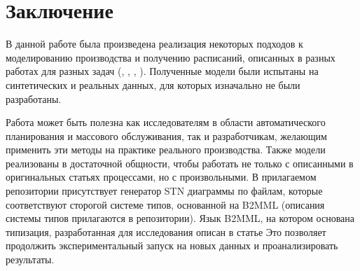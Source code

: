 \documentclass[12pt, twoside]{article}
\theoremstyle{definition}
\begin{document}
\begin{center}
	\begin{table}
\centering
\renewcommand{\arraystretch}{2}
		\caption{Количество переменных и ограничений для разных заказов на производство процесса \ref{fig:stn_exmp}}
		\label{table:results}
	\end{table}

\end{center}

\section{Заключение}
В данной работе была произведена реализация некоторых подходов к моделированию производства и получению расписаний, описанных в разных работах для разных задач (\cite{lpheuristic}, \cite{dairy}, \cite{reallife}, \cite{precendancebased}). Полученные модели были испытаны на синтетических и реальных данных, для которых изначально не были разработаны.

Работа может быть полезна как исследователям в области автоматического планирования и массового обслуживания, так и разработчикам, желающим применить эти методы на практике реального производства. Также модели реализованы в достаточной общности, чтобы работать не только с описанными в оригинальных статьях процессами, но с произвольными. В прилагаемом репозитории присутствует генератор STN диаграммы по файлам, которые соответствуют сторогой системе типов, основанной на B2MML (описания системы типов прилагаются в репозитории). Язык B2MML, на котором основана типизация, разработанная для исследования описан в статье \cite{b2mml} Это позволяет продолжить экспериментальный запуск на новых данных и проанализировать результаты.
\end{document}
